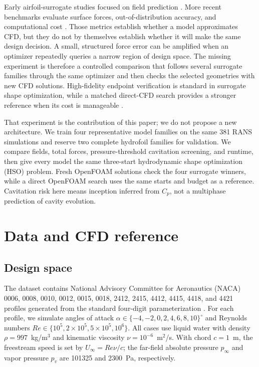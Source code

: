 \documentclass{article}
\begin{document}
Early airfoil-surrogate studies focused on field prediction
\citep{guo2016steady,bhatnagar2019aerodynamic,sekar2019airfoils,thuerey2020rans}.
More recent benchmarks evaluate surface forces, out-of-distribution accuracy,
and computational cost \citep{bonnet2022airfrans,li2023gino,yagoubi2025ml4cfd}.
Those metrics establish whether a model approximates CFD, but they do not by
themselves establish whether it will make the same design decision. A small,
structured force error can be amplified when an optimizer repeatedly queries a
narrow region of design space. The missing experiment is therefore a
controlled comparison that follows several surrogate families through the
same optimizer and then checks the selected geometries with new CFD solutions.
High-fidelity endpoint verification is standard in surrogate shape optimization, while a
matched direct-CFD search provides a stronger reference when its cost is
manageable \citep{li2022mlaso,shukla2023operators}.

That experiment is the contribution of this paper; we do not propose a new
architecture. We train four representative model families on the same 381 RANS
simulations and reserve two complete hydrofoil families for validation. We compare
fields, total forces, pressure-threshold cavitation screening, and runtime, then
give every model the same three-start hydrodynamic shape optimization (HSO)
problem. Fresh OpenFOAM solutions
check the four surrogate winners, while a direct OpenFOAM search uses the same
starts and budget as a reference. Cavitation risk here means inception inferred
from $C_p$, not a multiphase prediction of cavity evolution.

\section{Data and CFD reference}
\subsection{Design space}
The dataset contains National Advisory Committee for Aeronautics (NACA) 0006, 0008, 0010, 0012, 0015, 0018, 2412, 2415, 4412, 4415, 4418, and 4421 profiles generated from the standard four-digit parameterization \citep{abbott1959airfoils}. For each profile, we simulate angles of attack $\alpha\in\{-4,-2,0,2,4,6,8,10\}^{\circ}$ and Reynolds numbers $Re\in\{10^5,2\times10^5,5\times10^5,10^6\}$. All cases use liquid water with density $\rho=997$~kg/m$^3$ and kinematic viscosity $\nu=10^{-6}$~m$^2$/s. With chord $c=1$~m, the freestream speed is set by $U_\infty=Re\nu/c$; the far-field absolute pressure $p_\infty$ and vapor pressure $p_v$ are 101325 and 2300~Pa, respectively.
\end{document}
